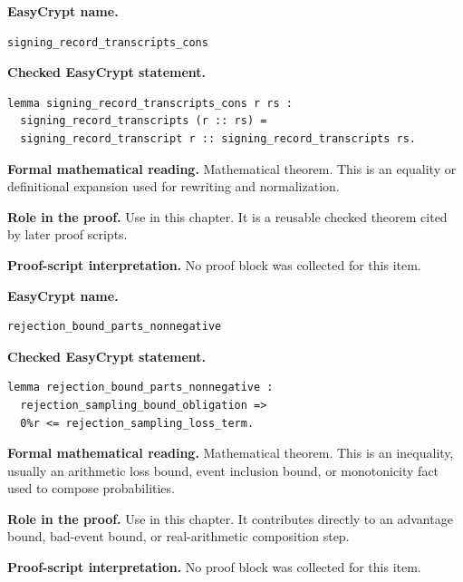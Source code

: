 \begin{formaltheorem}
\noindent\textbf{EasyCrypt name.}
\begin{lstlisting}[language=EasyCrypt,basicstyle=\ttfamily\scriptsize]
signing_record_transcripts_cons
\end{lstlisting}
\noindent\textbf{Checked EasyCrypt statement.}
\begin{lstlisting}[language=EasyCrypt,basicstyle=\ttfamily\scriptsize]
lemma signing_record_transcripts_cons r rs :
  signing_record_transcripts (r :: rs) =
  signing_record_transcript r :: signing_record_transcripts rs.
\end{lstlisting}
\noindent\textbf{Formal mathematical reading.}
Mathematical theorem. This is an equality or definitional expansion used for rewriting and normalization.

\noindent\textbf{Role in the proof.}
Use in this chapter. It is a reusable checked theorem cited by later proof scripts.

\noindent\textbf{Proof-script interpretation.}
No proof block was collected for this item.

\end{formaltheorem}

\begin{formaltheorem}
\noindent\textbf{EasyCrypt name.}
\begin{lstlisting}[language=EasyCrypt,basicstyle=\ttfamily\scriptsize]
rejection_bound_parts_nonnegative
\end{lstlisting}
\noindent\textbf{Checked EasyCrypt statement.}
\begin{lstlisting}[language=EasyCrypt,basicstyle=\ttfamily\scriptsize]
lemma rejection_bound_parts_nonnegative :
  rejection_sampling_bound_obligation =>
  0%r <= rejection_sampling_loss_term.
\end{lstlisting}
\noindent\textbf{Formal mathematical reading.}
Mathematical theorem. This is an inequality, usually an arithmetic loss bound, event inclusion bound, or monotonicity fact used to compose probabilities.

\noindent\textbf{Role in the proof.}
Use in this chapter. It contributes directly to an advantage bound, bad-event bound, or real-arithmetic composition step.

\noindent\textbf{Proof-script interpretation.}
No proof block was collected for this item.

\end{formaltheorem}

